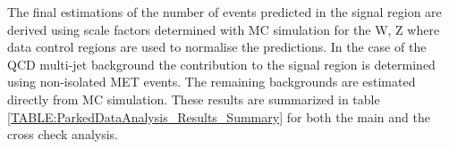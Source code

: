 
The final estimations of the number of events predicted in the signal region are derived using scale factors determined with \gls{MC} simulation for the W, Z where data control regions are used to normalise the predictions. In the case of the \gls{QCD} multi-jet background the contribution to the signal region is determined using non-isolated \gls{MET} events. The remaining backgrounds are estimated directly from \gls{MC} simulation. These results are summarized in table \ref{TABLE:ParkedDataAnalysis_Results_Summary} for both the main and the cross check analysis.





